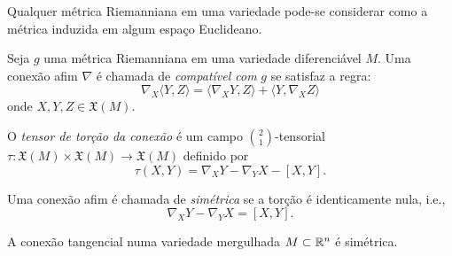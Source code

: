 \begin{teorema}
	Qualquer métrica Riemanniana em uma variedade pode-se considerar como a métrica induzida em algum espaço Euclideano.
\end{teorema}

\begin{definicao}
	Seja $g$ uma métrica Riemanniana em uma variedade diferenciável $M$. Uma conexão afim $\nabla$ é chamada de \emph{compatível com} $g$ se satisfaz a regra:
	\begin{equation*}
		\nabla_X \langle Y,Z \rangle = \langle \nabla_X Y, Z \rangle + \langle Y, \nabla_X Z \rangle
	\end{equation*}
	onde $X,Y,Z \in \mathfrak{X}(M)$.
\end{definicao}

\begin{definicao}
	O \emph{tensor de torção da conexão} é um campo $ \binom{2}{1} $-tensorial $\tau: \mathfrak{X}(M) \times \mathfrak{X}(M) \rightarrow \mathfrak{X}(M)$ definido por
	\begin{equation*}
		\tau(X,Y) = \nabla_X Y - \nabla_Y X - [X,Y].
	\end{equation*}
\end{definicao}

\begin{definicao}
	Uma conexão afim é chamada de \emph{simétrica} se a torção é identicamente nula, i.e.,
	\begin{equation*}
		\nabla_X Y - \nabla_Y X = [X,Y].
	\end{equation*}
\end{definicao}

\begin{lema}
	A conexão tangencial numa variedade mergulhada $M \subset \mathbb{R}^n$ é simétrica.
\end{lema}

